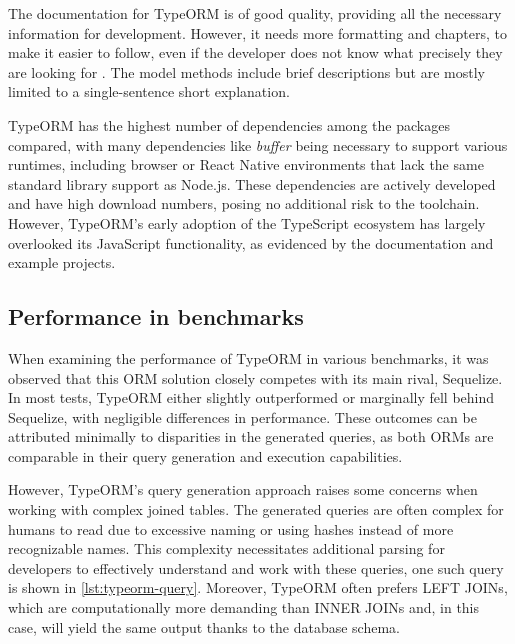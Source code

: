 The documentation for TypeORM is of good quality, providing all the necessary
information for development. However, it needs more formatting and chapters,
to make it easier to follow, even if the developer does not know what precisely
they are looking for \cite{typeORMDocs}. The model methods include brief
descriptions but are mostly limited to a single-sentence short explanation.

TypeORM has the highest number of dependencies among the packages compared, with
many dependencies like \textit{buffer} being necessary to support various
runtimes, including browser or React Native environments that lack the same
standard library support as Node.js. These dependencies are actively developed
and have high download numbers, posing no additional risk to the toolchain.
However, TypeORM's early adoption of the TypeScript ecosystem has largely
overlooked its JavaScript functionality, as evidenced by the documentation and
example projects.

\subsection*{Performance in benchmarks}

When examining the performance of TypeORM in various benchmarks, it was observed
that this ORM solution closely competes with its main rival, Sequelize. In most
tests, TypeORM either slightly outperformed or marginally fell behind Sequelize,
with negligible differences in performance. These outcomes can be attributed
minimally to disparities in the generated queries, as both ORMs are comparable
in their query generation and execution capabilities.

However, TypeORM's query generation approach raises some concerns when working
with complex joined tables. The generated queries are often complex for humans
to read due to excessive naming or using hashes instead of more recognizable
names. This complexity necessitates additional parsing for developers to
effectively understand and work with these queries, one such query is shown in
\autoref{lst:typeorm-query}. Moreover, TypeORM often prefers LEFT JOINs, which
are computationally more demanding than INNER JOINs and, in this case, will
yield the same output thanks to the database schema.


